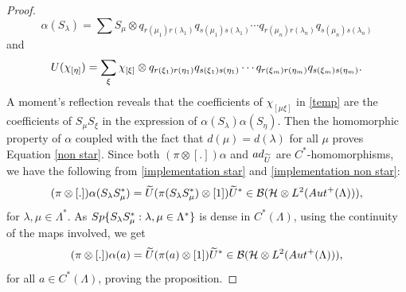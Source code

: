 \documentclass[10pt,a4paper]{amsart}
\newcommand{\cal}{\mathcal}
\newcommand{\clb}{{\cal B}}
\newcommand{\clh}{{\cal H}}
\begin{document}
\begin{proof}
\begin{displaymath}  
\alpha(S_{\lambda})=\sum S_{\mu}\otimes q_{r(\mu_{1})r(\lambda_{1})}q_{s(\mu_{1})s(\lambda_{1})}\cdots q_{r(\mu_{n})r(\lambda_{n})}q_{s(\mu_{n})s(\lambda_{n})}
\end{displaymath} 
and 
\begin{displaymath}
U(\chi_{[\eta]})=\sum\limits_{\xi}\chi_{[\xi]}\otimes q_{r(\xi_{1})r(\eta_{1})}q_{s(\xi_{1})s(\eta_{1})}\cdots \\
    q_{r(\xi_{m})r(\eta_{m})}q_{s(\xi_{m})s(\eta_{m})}.
\end{displaymath} 
A moment's reflection reveals that the coefficients of $\chi_{[\mu\xi]}$ in \ref{temp} are the coefficients of $S_{\mu}S_{\xi}$ in the expression of $\alpha(S_{\lambda})\alpha(S_{\eta})$. Then the homomorphic property of $\alpha$ coupled with the fact that $d(\mu)=d(\lambda)$ for all $\mu$ proves Equation \ref{non star}.  
Since both $(\pi\otimes[.])\alpha$ and ${\rm ad}_{\widetilde{U}}$ are $C^{\ast}$-homomorphisms, we have the following from \ref{implementation star} and \ref{implementation non star}:
\begin{displaymath}
 (\pi\otimes[.])\alpha(S_{\lambda}S_{\mu}^{\ast})=\widetilde{U}(\pi(S_{\lambda}S_{\mu}^{\ast})\otimes[1])\widetilde{U}^{\ast}\in \clb(\clh\otimes L^{2}({\rm Aut}^{+}(\Lambda))),   
\end{displaymath}
for $\lambda,\mu\in\Lambda^{\ast}$. As ${\rm Sp}\{S_{\lambda}S_{\mu}^{\ast}:\lambda,\mu\in\Lambda^{\ast}\}$ is dense in $C^{\ast}(\Lambda)$, using the continuity of the maps involved, we get
\begin{displaymath}
 (\pi\otimes[.])\alpha(a)=\widetilde{U}(\pi(a)\otimes[1])\widetilde{U}^{\ast}\in \clb(\clh\otimes L^{2}({\rm Aut}^{+}(\Lambda))),   
\end{displaymath}
for all $a\in C^{\ast}(\Lambda)$, proving the proposition.
\end{proof} 
\end{document}
